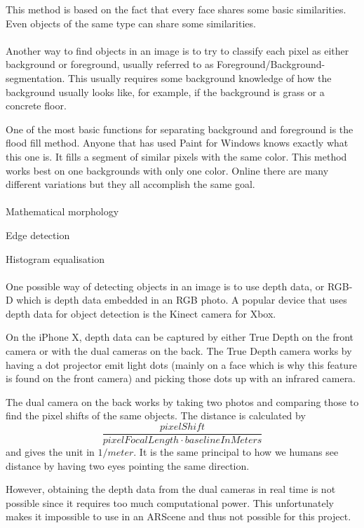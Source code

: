This method is based on the fact that every face shares some basic similarities. Even objects of the same type can share some similarities.\cite{violaJones}
\\\\
Another way to find objects in an image is to try to classify each pixel as either background or foreground, usually referred to as Foreground/Background-segmentation. This usually requires some background knowledge of how the background usually looks like, for example, if the background is grass or a concrete floor.

One of the most basic functions for separating background and foreground is the flood fill method.
Anyone that has used Paint for Windows knows exactly what this one is. It fills a segment of similar pixels with the same color. This method works best on one backgrounds with only one color.
Online there are many different variations but they all accomplish the same goal.\cite{floodFill}
\\\\
Mathematical morphology

Edge detection

Histogram equalisation
\\\\
One possible way of detecting objects in an image is to use depth data, or RGB-D which is depth data embedded in an RGB photo.
A popular device that uses depth data for object detection is the Kinect camera
for Xbox.

On the iPhone X, depth data can be captured by either True Depth on the front camera or with the dual cameras on the back. The True Depth camera works by having a dot projector emit light dots (mainly on a face which is why this feature is found on the front camera) and picking those dots up with an infrared camera.

The dual camera on the back works by taking two photos and comparing those to find the pixel shifts of the same objects. The distance is calculated by \[ \frac{pixelShift} { pixelFocalLength \cdot baselineInMeters}\] and gives the unit in $1/meter$. It is the same principal to how we humans see distance by having two eyes pointing the same direction. \cite{depthMap}

However, obtaining the depth data from the dual cameras in real time is not possible since it requires too much computational power. This unfortunately makes it impossible to use in an ARScene and thus not possible for this project.\\

